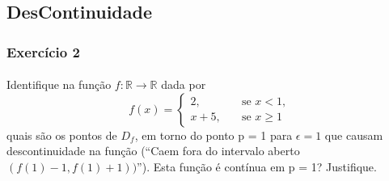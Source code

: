 \documentclass{article}
\begin{document}
\subsection{DesContinuidade}
\subsubsection{Exerc\'icio 2}
\paragraph{} Identifique na fun\c c\~ao $f:\mathbb{R}\rightarrow\mathbb{R}$ dada por 
$$
f(x) = \left\{\begin{array}{ll}
		2, & \quad \text{se } x < 1,\\
		x + 5, & \quad \text{se } x\geq 1
\end{array}\right.
$$
quais s\~ao os pontos de $D_f$, em torno do ponto p = 1 para $\epsilon = 1$ que causam descontinuidade na fun\c c\~ao (``Caem fora do intervalo aberto $(f(1) - 1, f(1) + 1))$''). Esta fun\c c\~ao \'e cont\'inua em p = 1? Justifique. 
\end{document}
